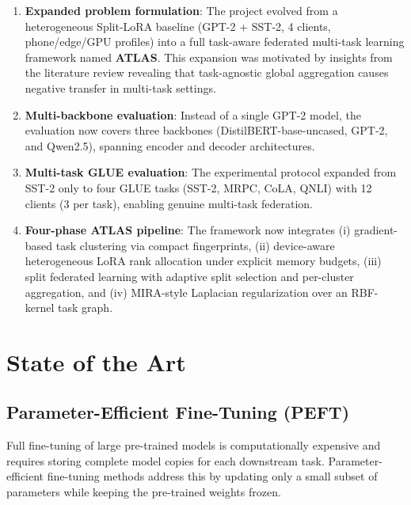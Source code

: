 \documentclass[11pt,a4paper]{article}
\begin{document}
\begin{enumerate}
\item \textbf{Expanded problem formulation}: The project evolved from a heterogeneous Split-LoRA baseline (GPT-2 + SST-2, 4 clients, phone/edge/GPU profiles) into a full task-aware federated multi-task learning framework named \textbf{ATLAS}. This expansion was motivated by insights from the literature review revealing that task-agnostic global aggregation causes negative transfer in multi-task settings.

\item \textbf{Multi-backbone evaluation}: Instead of a single GPT-2 model, the evaluation now covers three backbones (DistilBERT-base-uncased, GPT-2, and Qwen2.5), spanning encoder and decoder architectures.

\item \textbf{Multi-task GLUE evaluation}: The experimental protocol expanded from SST-2 only to four GLUE tasks (SST-2, MRPC, CoLA, QNLI) with 12 clients (3 per task), enabling genuine multi-task federation.

\item \textbf{Four-phase ATLAS pipeline}: The framework now integrates (i) gradient-based task clustering via compact fingerprints, (ii) device-aware heterogeneous LoRA rank allocation under explicit memory budgets, (iii) split federated learning with adaptive split selection and per-cluster aggregation, and (iv) MIRA-style Laplacian regularization over an RBF-kernel task graph.
\end{enumerate}


\section{State of the Art}

\subsection{Parameter-Efficient Fine-Tuning (PEFT)}

Full fine-tuning of large pre-trained models is computationally expensive and requires storing complete model copies for each downstream task. Parameter-efficient fine-tuning methods address this by updating only a small subset of parameters while keeping the pre-trained weights frozen.
\end{document}
